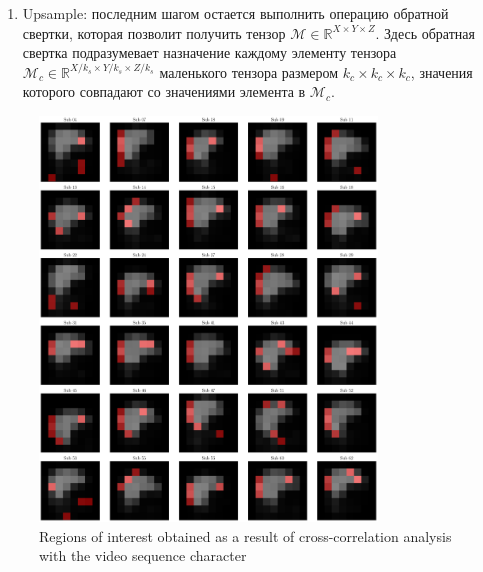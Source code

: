 \documentclass[a4paper, 12pt]{extarticle}
\begin{document}
\begin{enumerate}
	\item Upsample: последним шагом остается выполнить операцию обратной свертки, которая позволит получить тензор $\mathcal{M} \in \mathbb{R}^{X \times Y \times Z}$. Здесь обратная свертка подразумевает назначение каждому элементу тензора $\mathcal{M}_c \in \mathbb{R}^{X/ k_s \times Y/ k_s \times Z/ k_s}$ маленького тензора размером $k_c \times k_c \times k_c$, значения которого совпадают со значениями элемента в $\mathcal{M}_c$.
	
\end{enumerate}


\begin{figure}[h!]
    \centering
    \includegraphics[width=0.8\textwidth]{cross_correlations.pdf}
    \caption{Regions of interest obtained as a result of cross-correlation analysis with the video sequence character}
\end{figure}
\end{document}
